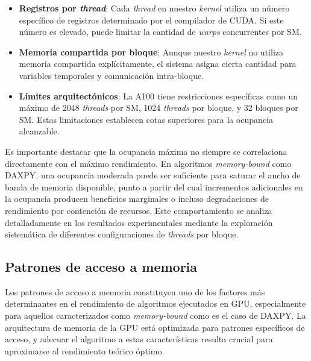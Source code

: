         \begin{itemize}
            
            \item \textbf{Registros por \textit{thread}}: Cada \textit{thread} en nuestro \textit{kernel} utiliza un número específico de registros determinado por el compilador de CUDA. Si este número es elevado, puede limitar la cantidad de \textit{warps} concurrentes por SM.
            
            \item \textbf{Memoria compartida por bloque}: Aunque nuestro \textit{kernel} no utiliza memoria compartida explícitamente, el sistema asigna cierta cantidad para variables temporales y comunicación intra-bloque.
            
            \item \textbf{Límites arquitectónicos}: La A100 tiene restricciones específicas como un máximo de 2048 \textit{threads} por SM, 1024 \textit{threads} por bloque, y 32 bloques por SM. Estas limitaciones establecen cotas superiores para la ocupancia alcanzable.
       
        \end{itemize}

        Es importante destacar que la ocupancia máxima no siempre se correlaciona directamente con el máximo rendimiento. En algoritmos \textit{memory-bound} como DAXPY, una ocupancia moderada puede ser suficiente para saturar el ancho de banda de memoria disponible, punto a partir del cual incrementos adicionales en la ocupancia producen beneficios marginales o incluso degradaciones de rendimiento por contención de recursos. Este comportamiento se analiza detalladamente en los resultados experimentales mediante la exploración sistemática de diferentes configuraciones de \textit{threads} por bloque.

    \subsection{Patrones de acceso a memoria}

        Los patrones de acceso a memoria constituyen uno de los factores más determinantes en el rendimiento de algoritmos ejecutados en GPU, especialmente para aquellos caracterizados como \textit{memory-bound} como es el caso de DAXPY. La arquitectura de memoria de la GPU está optimizada para patrones específicos de acceso, y adecuar el algoritmo a estas características resulta crucial para aproximarse al rendimiento teórico óptimo.

